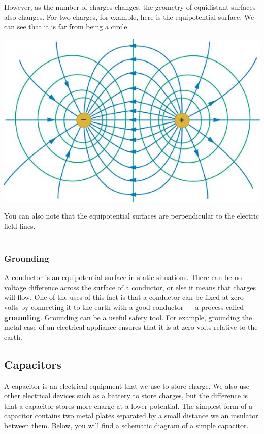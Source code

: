 \documentclass[9pt]{exam}
\begin{document}
	However, as the number of charges changes, the geometry of equidistant surfaces also changes. For two charges, for example, here is the equipotential surface. We can see that it is far from being a circle. \begin{center}
		\includegraphics[scale=0.27]{equip_2}
	\end{center}
	You can also note that the equipotential surfaces are perpendicular to the electric field lines. \\ \\
	\subsubsection*{Grounding}
	A conductor is an equipotential surface in static situations. There can be no voltage difference across the surface of a conductor, or else it means that charges will flow. One of the uses of this fact is that a conductor can be fixed at zero volts by connecting it to the earth with a good conductor — a process called \textbf{grounding}. Grounding can be a useful safety tool. For example, grounding the metal case of an electrical appliance ensures that it is at zero volts relative to the earth.
		\subsection*{Capacitors}
	A capacitor is an electrical equipment that we use to store charge. We also use other electrical devices such as a battery to store charges, but the difference is that a capacitor stores more charge at a lower potential. The simplest form of a capacitor contains two metal plates separated by a small distance we an insulator between them. Below, you will find a schematic diagram of a simple capacitor.
	
\end{document}
